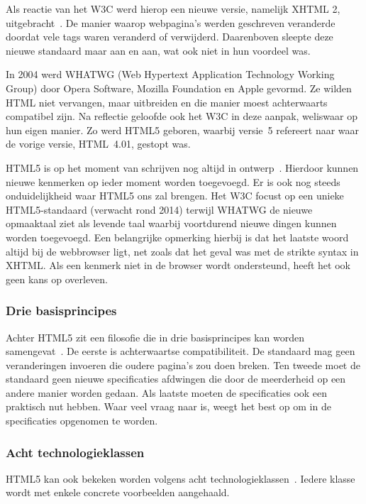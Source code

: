 Als reactie van het W3C werd hierop  een nieuwe versie, namelijk XHTML 2, uitgebracht~\cite{MacDonald2011}.
De manier waarop webpagina's werden geschreven veranderde doordat vele tags waren veranderd of verwijderd. 
Daarenboven sleepte deze nieuwe standaard maar aan en aan, wat ook niet in hun voordeel was. 

In 2004 werd WHATWG (Web Hypertext Application Technology Working Group) door Opera Software, Mozilla Foundation en Apple gevormd. 
Ze wilden HTML niet vervangen, maar uitbreiden en die manier moest achterwaarts compatibel zijn. 
Na reflectie geloofde ook het W3C in deze aanpak, weliswaar op hun eigen manier.  
Zo werd HTML5 geboren, waarbij versie~5 refereert naar waar de vorige versie, HTML~4.01, gestopt was.

HTML5 is op het moment van schrijven nog altijd in ontwerp~\cite{MacDonald2011}. 
Hierdoor kunnen nieuwe kenmerken op ieder moment worden toegevoegd.  
Er is ook nog steeds onduidelijkheid waar HTML5 ons zal brengen.  
Het W3C focust op een unieke HTML5-standaard (verwacht rond 2014) terwijl WHATWG de nieuwe opmaaktaal ziet als levende taal waarbij voortdurend  nieuwe dingen kunnen worden toegevoegd. 
Een belangrijke opmerking hierbij is dat het laatste woord altijd bij de webbrowser ligt, net zoals dat het geval was met de strikte syntax in XHTML. 
Als een kenmerk niet in de browser wordt ondersteund, heeft het ook geen kans op overleven.

\subsubsection{Drie basisprincipes}
Achter HTML5 zit een filosofie die in drie basisprincipes kan worden samengevat~\cite{MacDonald2011}.  
De eerste is achterwaartse compatibiliteit. 
De standaard mag geen veranderingen invoeren die oudere pagina's zou doen breken. 
Ten tweede moet de standaard geen nieuwe specificaties afdwingen die door de meerderheid op een andere manier worden gedaan. 
Als laatste moeten de specificaties ook een praktisch nut hebben. 
Waar veel vraag naar is, weegt het best op om in de specificaties opgenomen te worden.

\subsubsection{Acht technologieklassen}
HTML5 kan ook bekeken worden volgens acht technologieklassen~\cite{W3C2012}. 
Iedere klasse wordt met enkele concrete voorbeelden aangehaald.

